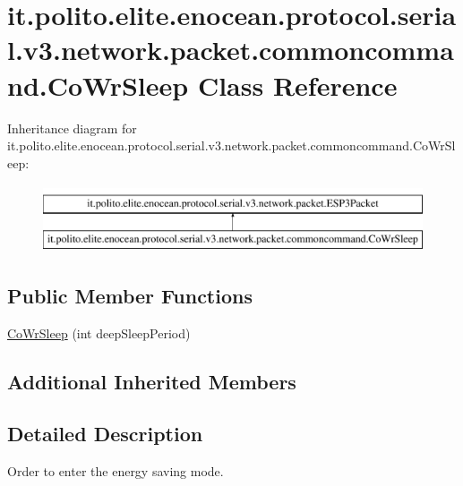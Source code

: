 \hypertarget{classit_1_1polito_1_1elite_1_1enocean_1_1protocol_1_1serial_1_1v3_1_1network_1_1packet_1_1commoncommand_1_1_co_wr_sleep}{}\section{it.\+polito.\+elite.\+enocean.\+protocol.\+serial.\+v3.\+network.\+packet.\+commoncommand.\+Co\+Wr\+Sleep Class Reference}
\label{classit_1_1polito_1_1elite_1_1enocean_1_1protocol_1_1serial_1_1v3_1_1network_1_1packet_1_1commoncommand_1_1_co_wr_sleep}
Inheritance diagram for it.\+polito.\+elite.\+enocean.\+protocol.\+serial.\+v3.\+network.\+packet.\+commoncommand.\+Co\+Wr\+Sleep\+:\begin{figure}[H]
\begin{center}
\leavevmode
\includegraphics[height=2.000000cm]{classit_1_1polito_1_1elite_1_1enocean_1_1protocol_1_1serial_1_1v3_1_1network_1_1packet_1_1commoncommand_1_1_co_wr_sleep}
\end{center}
\end{figure}
\subsection*{Public Member Functions}
\begin{DoxyCompactItemize}
\item 
\hyperlink{classit_1_1polito_1_1elite_1_1enocean_1_1protocol_1_1serial_1_1v3_1_1network_1_1packet_1_1commoncommand_1_1_co_wr_sleep_ac86ab6c5db13d1d957ac557cf87dfc5f}{Co\+Wr\+Sleep} (int deep\+Sleep\+Period)
\end{DoxyCompactItemize}
\subsection*{Additional Inherited Members}


\subsection{Detailed Description}
Order to enter the energy saving mode.

